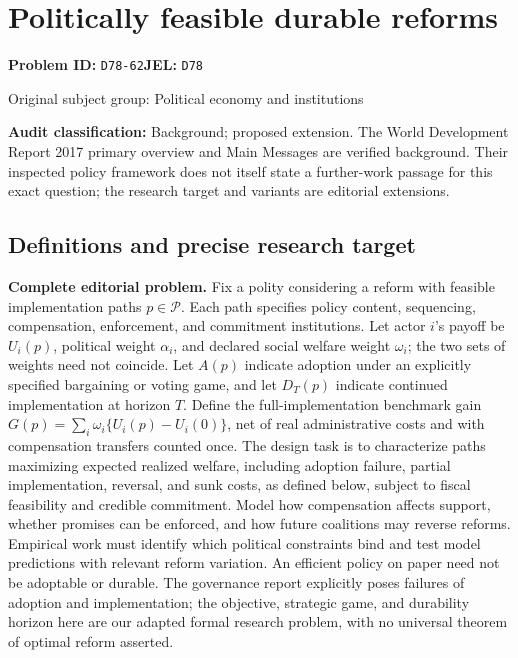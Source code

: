 \documentclass[11pt,a4paper]{article}
\begin{document}
\section*{Politically feasible durable reforms}
\textbf{Problem ID:} \texttt{D78-62}\quad \textbf{JEL:} \texttt{D78}\par
\label{problem:OP-0389}
{\sffamily\small\color{muted}Original subject group: Political economy and institutions\par}
\label{definitions:problem:30007671}
\textbf{Audit classification:} Background; proposed extension. The World Development Report 2017 primary overview and Main Messages are verified background. Their inspected policy framework does not itself state a further-work passage for this exact question; the research target and variants are editorial extensions.
\subsection*{Definitions and precise research target}
\textbf{Complete editorial problem.} Fix a polity considering a reform with feasible implementation paths \(p\in\mathcal P\). Each path specifies policy content, sequencing, compensation, enforcement, and commitment institutions. Let actor \(i\)'s payoff be \(U_i(p)\), political weight \(\alpha_i\), and declared social welfare weight \(\omega_i\); the two sets of weights need not coincide. Let \(A(p)\) indicate adoption under an explicitly specified bargaining or voting game, and let \(D_T(p)\) indicate continued implementation at horizon \(T\). Define the full-implementation benchmark gain \(G(p)=\sum_i\omega_i\{U_i(p)-U_i(0)\}\), net of real administrative costs and with compensation transfers counted once. The design task is to characterize paths maximizing expected realized welfare, including adoption failure, partial implementation, reversal, and sunk costs, as defined below, subject to fiscal feasibility and credible commitment. Model how compensation affects support, whether promises can be enforced, and how future coalitions may reverse reforms. Empirical work must identify which political constraints bind and test model predictions with relevant reform variation. An efficient policy on paper need not be adoptable or durable. The governance report explicitly poses failures of adoption and implementation; the objective, strategic game, and durability horizon here are our adapted formal research problem, with no universal theorem of optimal reform asserted.
\end{document}
